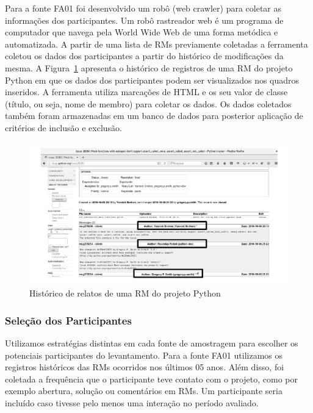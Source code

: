 Para a fonte FA01 foi desenvolvido um robô (web crawler) para coletar as
informações dos participantes. Um robô rastreador web é um programa de
computador que navega pela World Wide Web de uma forma metódica e automatizada.
A partir de uma lista de RMs previamente coletadas a ferramenta coletou os dados
dos participantes a partir do histórico de modificações da mesma. A
Figura~\ref{fig:historico-rm-python} apresenta o histórico de registros de uma
RM do projeto Python em que os dados dos participantes podem ser visualizados
nos quadros inseridos. A ferramenta utiliza marcações de HTML e os seu valor de
classe (título, ou seja, nome de membro) para coletar os dados. Os dados
coletados também foram armazenadas em um banco de dados para posterior aplicação
de critérios de inclusão e exclusão.

\begin{figure}[htpb]
	\centering
	\includegraphics[width=0.9\linewidth]{./chapter-pesquisa-com-profissionais/img/historico-rm-python.pdf}
	\caption{Histórico de relatos de uma RM do projeto Python}
\label{fig:historico-rm-python}
\end{figure}

\subsubsection{Seleção dos Participantes}
\label{subsubsec:pesquisa_profissionais_plano_pesquisa}

Utilizamos estratégias distintas em cada fonte de amostragem para escolher os
potenciais participantes do levantamento. Para a fonte FA01 utilizamos os
registros históricos das RMs ocorridos nos últimos 05 anos. Além disso, foi
coletada a frequência que o participante teve contato com o projeto, como por
exemplo abertura, solução ou comentários em RMs. Um participante seria incluído
caso tivesse pelo menos uma interação no período avaliado.

